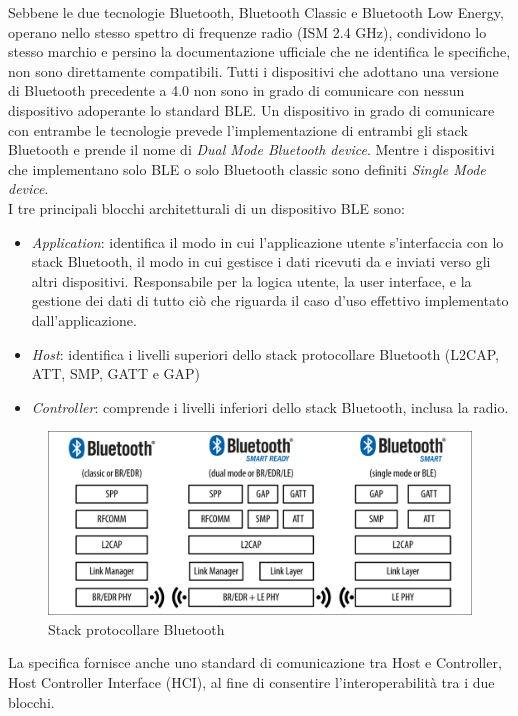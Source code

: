 \noindent Sebbene le due tecnologie Bluetooth, Bluetooth Classic e Bluetooth Low Energy, operano nello stesso spettro di frequenze radio (ISM 2.4 GHz), condividono lo stesso marchio e persino la documentazione ufficiale che ne identifica le specifiche, non sono direttamente compatibili. Tutti i dispositivi che adottano una versione di Bluetooth precedente a 4.0 non sono in grado di comunicare con nessun dispositivo adoperante lo standard BLE. Un dispositivo in grado di comunicare con entrambe le tecnologie prevede l'implementazione di entrambi gli stack Bluetooth e prende il nome di \textit{Dual Mode Bluetooth device}. Mentre i dispositivi che implementano solo BLE o solo Bluetooth classic sono definiti \textit{Single Mode device}.\\
I tre principali blocchi architetturali di un dispositivo BLE sono:
\begin{itemize}
    \item \textit{Application}: identifica il modo in cui l'applicazione utente s'interfaccia con lo stack Bluetooth, il modo in cui gestisce i dati ricevuti da e inviati verso gli altri dispositivi. Responsabile per la logica utente, la user interface, e la gestione dei dati di tutto ciò che riguarda il caso d'uso effettivo implementato dall'applicazione.
    \item \textit{Host}: identifica i livelli superiori dello stack protocollare Bluetooth (L2CAP, ATT, SMP, GATT e GAP)
    \item \textit{Controller}: comprende i livelli inferiori dello stack Bluetooth, inclusa la radio.
\end{itemize}

\begin{figure}[!ht]
    \centering
    \includegraphics[width = \textwidth]{images/Dual mode Bluetooth devices.png}
    \caption{Stack protocollare Bluetooth}
    \label{fig:stack_ble}
\end{figure}

\noindent La specifica fornisce anche uno standard di comunicazione tra Host e Controller, Host Controller Interface (HCI), al fine di consentire l'interoperabilità tra i due blocchi.




